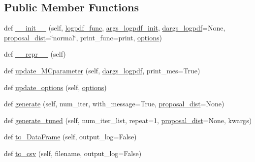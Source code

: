 \subsection*{Public Member Functions}
\begin{DoxyCompactItemize}
\item 
def \hyperlink{classmcgenerator_1_1MCgenerator_a7e1f401528dcb7adae97ef6c56a26e33}{\+\_\+\+\_\+init\+\_\+\+\_\+} (self, \hyperlink{classmcgenerator_1_1MCgenerator_af1c3264bf8854ee1c3e8ce1d56e3ba41}{logpdf\+\_\+func}, \hyperlink{classmcgenerator_1_1MCgenerator_aaa09cf8b31cac60f08738f35fdd702e4}{args\+\_\+logpdf\+\_\+init}, \hyperlink{classmcgenerator_1_1MCgenerator_ac265e882de548a3a059c608ae9500444}{dargs\+\_\+logpdf}=None, \hyperlink{classmcgenerator_1_1MCgenerator_a637be1c5c1878a2f2c79004f6c0c74d5}{proposal\+\_\+dist}=\char`\"{}normal\char`\"{}, print\+\_\+func=print, \hyperlink{classmcgenerator_1_1MCgenerator_a8c2303e354e36c0e72973e5ca25ad7b5}{options})
\item 
def \hyperlink{classmcgenerator_1_1MCgenerator_a242f49dce70773d317ffde2988c92c66}{\+\_\+\+\_\+repr\+\_\+\+\_\+} (self)
\item 
def \hyperlink{classmcgenerator_1_1MCgenerator_ac92600d8782d14be52db33b1259b10b1}{update\+\_\+\+M\+Cparameter} (self, \hyperlink{classmcgenerator_1_1MCgenerator_ac265e882de548a3a059c608ae9500444}{dargs\+\_\+logpdf}, print\+\_\+mes=True)
\item 
def \hyperlink{classmcgenerator_1_1MCgenerator_a9b7e41d377b67f8c83b34c62059f876d}{update\+\_\+options} (self, \hyperlink{classmcgenerator_1_1MCgenerator_a8c2303e354e36c0e72973e5ca25ad7b5}{options})
\item 
def \hyperlink{classmcgenerator_1_1MCgenerator_a660b1c6c2600d3cefc77690838c755b5}{generate} (self, num\+\_\+iter, with\+\_\+message=True, \hyperlink{classmcgenerator_1_1MCgenerator_a637be1c5c1878a2f2c79004f6c0c74d5}{proposal\+\_\+dist}=None)
\item 
def \hyperlink{classmcgenerator_1_1MCgenerator_ad6c5b6846464112f7ade3d6ca197e6d2}{generate\+\_\+tuned} (self, num\+\_\+iter\+\_\+list, repeat=1, \hyperlink{classmcgenerator_1_1MCgenerator_a637be1c5c1878a2f2c79004f6c0c74d5}{proposal\+\_\+dist}=None, kwargs)
\item 
def \hyperlink{classmcgenerator_1_1MCgenerator_ac5245cc93c2aa162abe1757ffdf60699}{to\+\_\+\+Data\+Frame} (self, output\+\_\+log=False)
\item 
def \hyperlink{classmcgenerator_1_1MCgenerator_adfd3a69e271b805a3fa48d6b3f14b0f5}{to\+\_\+csv} (self, filename, output\+\_\+log=False)
\end{DoxyCompactItemize}
